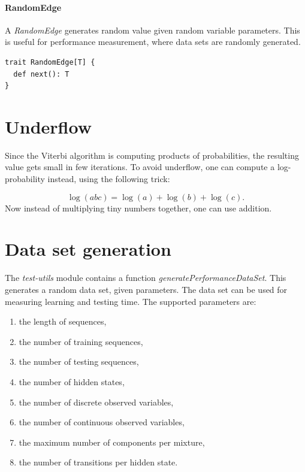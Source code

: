 \documentclass[thesis=B,english]{FITthesis}[2012/06/26]
\begin{document}
\paragraph{RandomEdge}

A \textit{RandomEdge} generates random value given random variable parameters. This is useful for performance measurement, where data sets are randomly generated.

\begin{lstlisting}[style=myScalaStyle]
trait RandomEdge[T] {
  def next(): T
}
\end{lstlisting}

\section{Underflow}

Since the Viterbi algorithm is computing products of probabilities, the resulting value gets small in few iterations. To avoid underflow, one can compute a log-probability instead, using the following trick:

\begin{equation*}
\log(abc) = \log(a)+\log(b)+\log(c).
\end{equation*}
Now instead of multiplying tiny numbers together, one can use addition.

\section{Data set generation}

The \textit{test-utils} module contains a function \textit{generatePerformanceDataSet}. This generates a random data set, given parameters. The data set can be used for measuring learning and testing time. The supported parameters are:

\begin{enumerate}
	\item the length of sequences,
	\item the number of training sequences,
	\item the number of testing sequences,
	\item the number of hidden states,
	\item the number of discrete observed variables,
	\item the number of continuous observed variables,
	\item the maximum number of components per mixture,
	\item the number of transitions per hidden state.
\end{enumerate}
\end{document}
